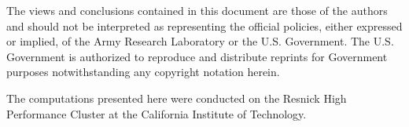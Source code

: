 \documentclass[twoside,12pt]{ctexart}
\begin{document}
The views and conclusions contained in this document are those of the authors and should not be interpreted as representing the official policies, either expressed or implied, of the Army Research Laboratory or the U.S. Government. The U.S. Government is authorized to reproduce and distribute reprints for Government purposes notwithstanding any copyright notation herein. 

The computations presented here were conducted on the Resnick High Performance Cluster at the California Institute of Technology.


% 

\newpage















\newpage
\onecolumn
\appendix


\end{document}
